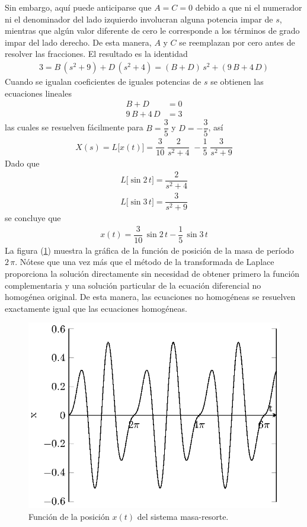 \par
Sin embargo, aquí puede anticiparse que $A = C = 0$ debido a que ni el numerador ni el denominador del lado izquierdo involucran alguna potencia impar de $s$, mientras que algún valor diferente de cero le corresponde a los términos de grado impar del lado derecho. De esta manera, $A$ y $C$ se reemplazan por cero antes de resolver las fracciones. El resultado es la identidad
\begin{align*}
3 = B \, (s^{2} + 9) + D \, (s^{2} + 4) =  (B + D) \, s^{2} + (9 \, B + 4 \, D)
\end{align*}
Cuando se igualan coeficientes de iguales potencias de $s$ se obtienen las ecuaciones lineales
\begin{align*}
B + D &= 0 \\
9 \, B + 4 \, D &= 3
\end{align*}
las cuales se resuelven fácilmente para $B = \dfrac{3}{5}$ y $D = - \dfrac{3}{5}$, así
\begin{align*}
X(s) = L \big[x(t)\big] = \dfrac{3}{10} \; \dfrac{2}{s^{2} + 4} \; - \dfrac{1}{5} \; \dfrac{3}{s^{2} + 9}
\end{align*}
Dado que 
\begin{align*}
L \big[ \sin 2 \, t \big] = \dfrac{2}{s^{2} + 4} \\[0.5em]
L \big[ \sin 3 \, t \big] = \dfrac{3}{s^{2} + 9}
\end{align*}
se concluye que
\begin{align*}
x(t) = \dfrac{3}{10} \, \sin 2 \, t - \dfrac{1}{5} \, \sin 3 \, t
\end{align*}
La figura (\ref{fig:figura_07_02_03}) muestra la gráfica de la función de posición de la masa de período $2 \, \pi$. Nótese que una vez más que el método de la transformada de Laplace proporciona la solución directamente sin necesidad de obtener primero la función complementaria y una solución particular de la ecuación diferencial no homogénea original. De esta manera, las ecuaciones no homogéneas se resuelven exactamente igual que las ecuaciones homogéneas.
\begin{figure}[H]
    \centering
    \includegraphics[scale=1.3]{Imagenes/sist_masa_resorte_plot.eps}
    \caption{Función de la posición $x(t)$ del sistema masa-resorte.}
    \label{fig:figura_07_02_03}
\end{figure}

